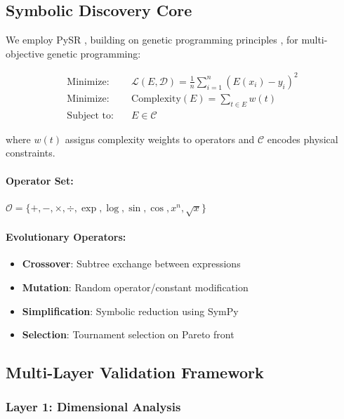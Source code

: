 \documentclass[twoside,11pt]{article}
\begin{document}
\subsection{Symbolic Discovery Core}

We employ PySR \citep{cranmer2023interpretable}, building on genetic programming principles \citep{koza1992genetic,fortin2012deap}, for multi-objective genetic programming:

\begin{align}
\text{Minimize:} \quad & \mathcal{L}(E, \mathcal{D}) = \frac{1}{n}\sum_{i=1}^n (E(x_i) - y_i)^2 \label{eq:loss}\\
\text{Minimize:} \quad & \text{Complexity}(E) = \sum_{t \in E} w(t) \label{eq:complexity}\\
\text{Subject to:} \quad & E \in \mathcal{C} \label{eq:constraints}
\end{align}

where $w(t)$ assigns complexity weights to operators and $\mathcal{C}$ encodes physical constraints.

\paragraph{Operator Set:} $\mathcal{O} = \{+, -, \times, \div, \exp, \log, \sin, \cos, x^n, \sqrt{x}\}$

\paragraph{Evolutionary Operators:}
\begin{itemize}
\item \textbf{Crossover}: Subtree exchange between expressions
\item \textbf{Mutation}: Random operator/constant modification
\item \textbf{Simplification}: Symbolic reduction using SymPy
\item \textbf{Selection}: Tournament selection on Pareto front
\end{itemize}

\subsection{Multi-Layer Validation Framework}

\subsubsection{Layer 1: Dimensional Analysis}
\end{document}
